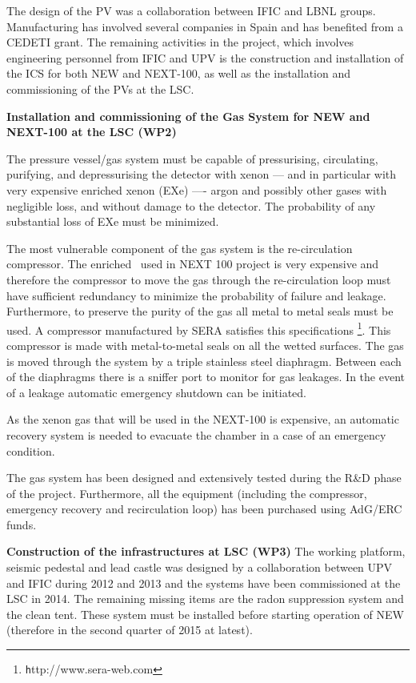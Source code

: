 The design of the PV was a collaboration between IFIC and LBNL groups. Manufacturing has involved several companies in Spain and has benefited from a CEDETI grant. The remaining activities in the project, which involves engineering personnel from IFIC and UPV is the construction and installation of the ICS for both NEW and NEXT-100, as well as the installation and commissioning of the PVs at the LSC.

{\bf Installation and commissioning of the Gas System for NEW and NEXT-100 at the LSC (WP2)}
 
The pressure vessel/gas system must be capable of pressurising, circulating, purifying, and depressurising the detector with xenon --- and in particular with very expensive enriched xenon (EXe) ---- argon and possibly other gases with negligible loss, and without damage to the detector. The probability of any substantial loss of EXe must be minimized. 

The most vulnerable component of the gas system is the re-circulation compressor.
The enriched \Xe\ used in NEXT 100 project is very expensive and therefore the compressor to move the gas through the re-circulation loop
must have sufficient redundancy to minimize the probability of failure and leakage. 
Furthermore, to preserve the purity of the gas all metal to metal seals must be used. A compressor manufactured by SERA satisfies this specifications \footnote{\texttt http://www.sera-web.com}.
This compressor is made with metal-to-metal seals on all the wetted surfaces. The gas is moved through the system by a triple stainless steel diaphragm. Between each
of the diaphragms there is a sniffer port to monitor for gas leakages. In the event of a leakage automatic emergency shutdown can be initiated.

As the xenon gas that will be used in the NEXT-100 is expensive, an automatic recovery system is needed
to evacuate the chamber in a case of an emergency condition. 

The gas system has been designed and extensively tested during the R\&D phase of the project. Furthermore, all the equipment (including the compressor, emergency recovery and recirculation loop) has been purchased using AdG/ERC funds.


{\bf  Construction of the infrastructures at LSC (WP3)}
The working platform, seismic pedestal and lead castle was designed by a collaboration between UPV and IFIC during 2012 and 2013 and the systems have been commissioned at the LSC in 2014. The remaining missing items are the radon suppression system and the clean tent. These system must be installed before starting operation of NEW (therefore in the second quarter of 2015 at latest). 

